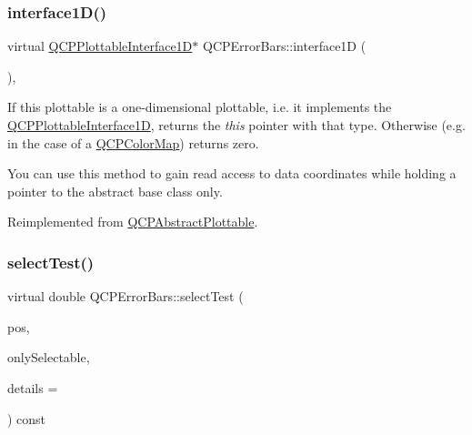 \mbox{\label{class_q_c_p_error_bars_a0b6fbf3a943b4241ee485d066cc8562a}} 
\subsubsection{\texorpdfstring{interface1\+D()}{interface1D()}\hspace{0.1cm}{\footnotesize\ttfamily [2/2]}}
{\footnotesize\ttfamily virtual \hyperlink{class_q_c_p_plottable_interface1_d}{Q\+C\+P\+Plottable\+Interface1D}$\ast$ Q\+C\+P\+Error\+Bars\+::interface1D (\begin{DoxyParamCaption}{ }\end{DoxyParamCaption})\hspace{0.3cm}{\ttfamily [inline]}, {\ttfamily [virtual]}}

If this plottable is a one-\/dimensional plottable, i.\+e. it implements the \hyperlink{class_q_c_p_plottable_interface1_d}{Q\+C\+P\+Plottable\+Interface1D}, returns the {\itshape this} pointer with that type. Otherwise (e.\+g. in the case of a \hyperlink{class_q_c_p_color_map}{Q\+C\+P\+Color\+Map}) returns zero.

You can use this method to gain read access to data coordinates while holding a pointer to the abstract base class only. 

Reimplemented from \hyperlink{class_q_c_p_abstract_plottable_a81fd9fd5c4f429c074785e2eb238a8e7}{Q\+C\+P\+Abstract\+Plottable}.

\mbox{\label{class_q_c_p_error_bars_a78990786eb7632c9ba07105888eb6b1c}} 
\subsubsection{\texorpdfstring{select\+Test()}{selectTest()}\hspace{0.1cm}{\footnotesize\ttfamily [1/2]}}
{\footnotesize\ttfamily virtual double Q\+C\+P\+Error\+Bars\+::select\+Test (\begin{DoxyParamCaption}\item[{const Q\+PointF \&}]{pos,  }\item[{bool}]{only\+Selectable,  }\item[{Q\+Variant $\ast$}]{details = {} }\end{DoxyParamCaption}) const\hspace{0.3cm}{\ttfamily [virtual]}}

